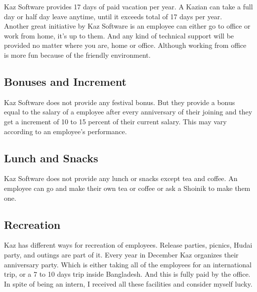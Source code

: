Kaz Software provides 17 days of paid vacation per year. 
A Kazian can take a full day or half day leave anytime, until it exceeds total of 17 days per year.\\

Another great initiative by Kaz Software is an employee can either go to office or work from home, it's up to them.
And any kind of technical support will be provided no matter where you are, home or office.
Although working from office is more fun because of the friendly environment.

\subsection{Bonuses and Increment}

Kaz Software does not provide any festival bonus.
But they provide a bonus equal to the salary of a employee after every anniversary of their joining and they get a increment of 10 to 15 percent of their current salary.
This may vary according to an employee's performance.

\subsection{Lunch and Snacks}

Kaz Software does not provide any lunch or snacks except tea and coffee.
An employee can go and make their own tea or coffee or ask a Shoinik to make them one.

\subsection{Recreation}

Kaz has different ways for recreation of employees.
Release parties, picnics, Hudai party, and outings are part of it.
Every year in December Kaz organizes their anniversary party.
Which is either taking all of the employees for an international trip, or a 7 to 10 days trip inside Bangladesh.
And this is fully paid by the office.
In spite of being an intern, I received all these facilities and consider myself lucky.
\\

